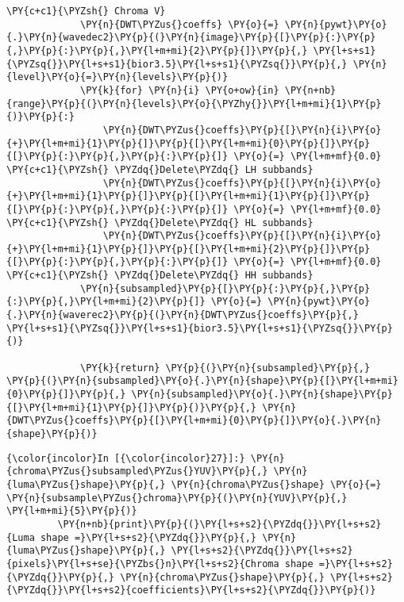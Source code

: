 \begin{Verbatim}[commandchars=\\\{\}]
             \PY{c+c1}{\PYZsh{} Chroma V}
             \PY{n}{DWT\PYZus{}coeffs} \PY{o}{=} \PY{n}{pywt}\PY{o}{.}\PY{n}{wavedec2}\PY{p}{(}\PY{n}{image}\PY{p}{[}\PY{p}{:}\PY{p}{,}\PY{p}{:}\PY{p}{,}\PY{l+m+mi}{2}\PY{p}{]}\PY{p}{,} \PY{l+s+s1}{\PYZsq{}}\PY{l+s+s1}{bior3.5}\PY{l+s+s1}{\PYZsq{}}\PY{p}{,} \PY{n}{level}\PY{o}{=}\PY{n}{levels}\PY{p}{)}
             \PY{k}{for} \PY{n}{i} \PY{o+ow}{in} \PY{n+nb}{range}\PY{p}{(}\PY{n}{levels}\PY{o}{\PYZhy{}}\PY{l+m+mi}{1}\PY{p}{)}\PY{p}{:}
                 \PY{n}{DWT\PYZus{}coeffs}\PY{p}{[}\PY{n}{i}\PY{o}{+}\PY{l+m+mi}{1}\PY{p}{]}\PY{p}{[}\PY{l+m+mi}{0}\PY{p}{]}\PY{p}{[}\PY{p}{:}\PY{p}{,}\PY{p}{:}\PY{p}{]} \PY{o}{=} \PY{l+m+mf}{0.0} \PY{c+c1}{\PYZsh{} \PYZdq{}Delete\PYZdq{} LH subbands}
                 \PY{n}{DWT\PYZus{}coeffs}\PY{p}{[}\PY{n}{i}\PY{o}{+}\PY{l+m+mi}{1}\PY{p}{]}\PY{p}{[}\PY{l+m+mi}{1}\PY{p}{]}\PY{p}{[}\PY{p}{:}\PY{p}{,}\PY{p}{:}\PY{p}{]} \PY{o}{=} \PY{l+m+mf}{0.0} \PY{c+c1}{\PYZsh{} \PYZdq{}Delete\PYZdq{} HL subbands}
                 \PY{n}{DWT\PYZus{}coeffs}\PY{p}{[}\PY{n}{i}\PY{o}{+}\PY{l+m+mi}{1}\PY{p}{]}\PY{p}{[}\PY{l+m+mi}{2}\PY{p}{]}\PY{p}{[}\PY{p}{:}\PY{p}{,}\PY{p}{:}\PY{p}{]} \PY{o}{=} \PY{l+m+mf}{0.0} \PY{c+c1}{\PYZsh{} \PYZdq{}Delete\PYZdq{} HH subbands}
             \PY{n}{subsampled}\PY{p}{[}\PY{p}{:}\PY{p}{,}\PY{p}{:}\PY{p}{,}\PY{l+m+mi}{2}\PY{p}{]} \PY{o}{=} \PY{n}{pywt}\PY{o}{.}\PY{n}{waverec2}\PY{p}{(}\PY{n}{DWT\PYZus{}coeffs}\PY{p}{,} \PY{l+s+s1}{\PYZsq{}}\PY{l+s+s1}{bior3.5}\PY{l+s+s1}{\PYZsq{}}\PY{p}{)}
         
             \PY{k}{return} \PY{p}{(}\PY{n}{subsampled}\PY{p}{,} \PY{p}{(}\PY{n}{subsampled}\PY{o}{.}\PY{n}{shape}\PY{p}{[}\PY{l+m+mi}{0}\PY{p}{]}\PY{p}{,} \PY{n}{subsampled}\PY{o}{.}\PY{n}{shape}\PY{p}{[}\PY{l+m+mi}{1}\PY{p}{]}\PY{p}{)}\PY{p}{,} \PY{n}{DWT\PYZus{}coeffs}\PY{p}{[}\PY{l+m+mi}{0}\PY{p}{]}\PY{o}{.}\PY{n}{shape}\PY{p}{)}
\end{Verbatim}


    \begin{Verbatim}[commandchars=\\\{\}]
{\color{incolor}In [{\color{incolor}27}]:} \PY{n}{chroma\PYZus{}subsampled\PYZus{}YUV}\PY{p}{,} \PY{n}{luma\PYZus{}shape}\PY{p}{,} \PY{n}{chroma\PYZus{}shape} \PY{o}{=} \PY{n}{subsample\PYZus{}chroma}\PY{p}{(}\PY{n}{YUV}\PY{p}{,} \PY{l+m+mi}{5}\PY{p}{)}
         \PY{n+nb}{print}\PY{p}{(}\PY{l+s+s2}{\PYZdq{}}\PY{l+s+s2}{Luma shape =}\PY{l+s+s2}{\PYZdq{}}\PY{p}{,} \PY{n}{luma\PYZus{}shape}\PY{p}{,} \PY{l+s+s2}{\PYZdq{}}\PY{l+s+s2}{pixels}\PY{l+s+se}{\PYZbs{}n}\PY{l+s+s2}{Chroma shape =}\PY{l+s+s2}{\PYZdq{}}\PY{p}{,} \PY{n}{chroma\PYZus{}shape}\PY{p}{,} \PY{l+s+s2}{\PYZdq{}}\PY{l+s+s2}{coefficients}\PY{l+s+s2}{\PYZdq{}}\PY{p}{)}
\end{Verbatim}


